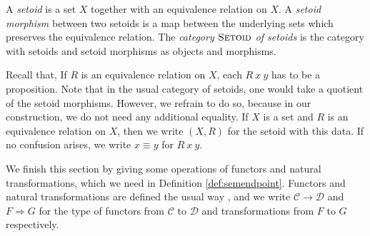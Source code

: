 \documentclass[9pt]{entcs}
\newcommand{\category}[1]{\textsc{#1}}
\newcommand{\0}{\textbf{0}} %
\newcommand{\setoids}{\category{Setoid}} %
\newcommand{\functor}[2]{#1 \longrightarrow #2} %
\newcommand{\nattrans}[2]{#1 \Longrightarrow #2} %
\newcommand{\remove}[1]{} %
\begin{document}
\begin{definition}
\label{def:setoid}
A \emph{setoid} is a set $X$ together with an equivalence relation on $X$.
A \emph{setoid morphism} between two setoids  is a map between the underlying sets which preserves the equivalence relation.
The \emph{category $\setoids$ of setoids} is the category with setoids and setoid morphisms as objects and morphisms.
\end{definition}

\remove{
\begin{definition}
We define
\begin{itemize}
	\item A \emph{setoid} is a set $X$ together with an equivalence relation on $X$;
	\item A \emph{setoid morphism} between two setoids  is a map between the underlying sets which preserves the equivalence relation.
\end{itemize}
The \emph{category of setoids} $\setoids$ is the category with setoids and setoid morphisms as objects and morphisms.
\end{definition}
}

Recall that, If $R$ is an equivalence relation on $X$, each $R \> x \> y$ has to be a proposition.
Note that in the usual category of setoids, one would take a quotient of the setoid morphisms.
However, we refrain to do so, because in our construction, we do not need any additional equality.
If $X$ is a set and $R$ is an equivalence relation on $X$, then we write $(X, R)$ for the setoid with this data.
If no confusion arises, we write $x \equiv y$ for $R \> x \> y$.

We finish this section by giving some operations of functors and natural transformations, which we need in Definition \ref{def:semendpoint}.
Functors and natural transformations are defined the usual way \cite{mac2013categories}, and we write $\functor{\mathcal{C}}{\mathcal{D}}$ and $\nattrans{F}{G}$ for the type of functors from $\mathcal{C}$ to $\mathcal{D}$ and transformations from $F$ to $G$ respectively.
\end{document}
